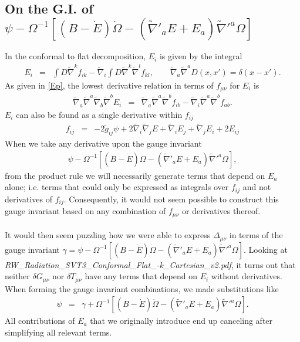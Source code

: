 \documentclass[10pt,letterpaper]{article}
\numberwithin{equation}{section}
\begin{document}
\subsection{On the G.I. of $\psi- \Omega^{-1}[(B-\dot E)\dot\Omega- (\tilde\nabla'_a E + E_a)\tilde\nabla'^a\Omega]$ }
In the conformal to flat decomposition, $E_i$ is given by the integral
\begin{eqnarray}
E_i &=& \int D \tilde\nabla^k f_{ik} - \tilde\nabla_i \int D \tilde\nabla^k \tilde\nabla^l f_{kl},\qquad \tilde\nabla_a\tilde\nabla^a D(x,x') = \delta(x-x').
\end{eqnarray}
As given in \eqref{Ep}, the lowest derivative relation in terms of $f_{\mu\nu}$ for $E_i$ is
\begin{eqnarray}
\tilde\nabla_a\tilde\nabla^a \tilde\nabla_b\tilde\nabla^b E_i &=&
\tilde\nabla_a\tilde\nabla^a \tilde\nabla^b f_{ib} - \tilde\nabla_i \tilde\nabla^a\tilde\nabla^b f_{ab}.
\end{eqnarray}
$E_i$ can also be found as a single derivative within $f_{ij}$
\begin{eqnarray}
f_{ij}&=& -2\tilde g_{ij}\psi + 2\tilde\nabla_i\tilde\nabla_j E + \tilde\nabla_i E_j + \tilde\nabla_j E_i + 2E_{ij}
\end{eqnarray}
When we take any derivative upon the gauge invariant
\begin{eqnarray}
\psi- \Omega^{-1}[(B-\dot E)\dot\Omega- (\tilde\nabla'_a E + E_a)\tilde\nabla'^a\Omega],
\end{eqnarray}
from the product rule we will necessarily generate terms that depend on $E_a$ alone; i.e. terms that could only be expressed as integrals over $f_{ij}$ and not derivatives of $f_{ij}$. Consequently, it would not seem possible to construct this gauge invariant based on any combination of $f_{\mu\nu}$ or derivatives thereof. 
\\ \\
It would then seem puzzling how we were able to express $\Delta_{\mu\nu}$ in terms of the gauge invariant $\gamma=\psi- \Omega^{-1}[(B-\dot E)\dot\Omega- (\tilde\nabla'_a E + E_a)\tilde\nabla'^a\Omega]$. Looking at \emph{RW\_Radiation\_SVT3\_Conformal\_Flat\_-k\_Cartesian\_v2.pdf}, it turns out that neither $\delta G_{\mu\nu}$ nor $\delta T_{\mu\nu}$ have any terms that depend on $E_i$ without derivatives. When forming the gauge invariant combinations, we made substitutions like
\begin{eqnarray}
\psi &=& \gamma + \Omega^{-1}[(B-\dot E)\dot\Omega- (\tilde\nabla'_a E + E_a)\tilde\nabla'^a\Omega].
\end{eqnarray}
All contributions of $E_a$ that we originally introduce end up canceling after simplifying all relevant terms.
\end{document}
